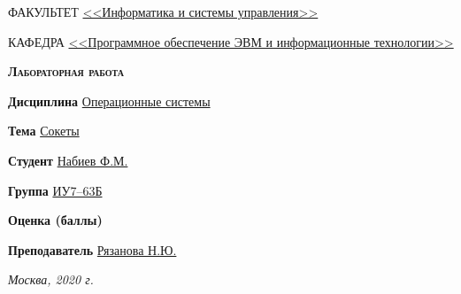 \begin{titlepage}
    \begin{flushleft}
        \small
        ФАКУЛЬТЕТ \uline{<<Информатика и системы управления>> \hfill} \par
        \vspace{0.25cm}
        КАФЕДРА \uline{<<Программное обеспечение ЭВМ и информационные технологии>> \hfill} \par
    \end{flushleft}

    \vspace{4cm}

    {\LARGE\scshape\bfseries
        Лабораторная работа 
    }

    \vspace{2cm}

    \begin{flushleft}
        \large
        \begin{minipage}[t]{0.8\linewidth}
            \textbf{Дисциплина }\uline{\hspace{0.5cm} Операционные системы \hfill} \par
            \vspace{0.25cm}
            \textbf{Тема }\uline{\hspace{0.5cm} Сокеты \hfill} \par
        \end{minipage}

        \vspace{1cm}

        \begin{minipage}[t]{0.6\linewidth}
            \textbf{Студент }\uline{\hspace{0.5cm} Набиев Ф.М. \hfill} \par
            \vspace{0.25cm}
            \textbf{Группа }\uline{\hspace{0.5cm} ИУ7--63Б \hfill} \par
            \vspace{0.25cm}
            \textbf{Оценка (баллы) }\uline{\hfill \hfill} \par
            \vspace{0.25cm}
            \textbf{Преподаватель }\uline{\hspace{0.5cm} Рязанова Н.Ю. \hfill} \par
        \end{minipage}

    \end{flushleft}

    \vfill

    \it
    Москва, 2020 г.

\end{titlepage}

